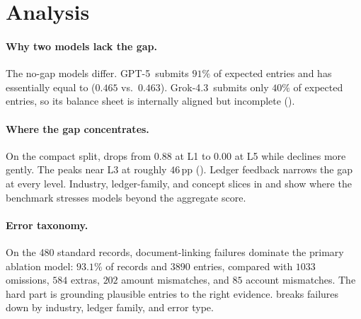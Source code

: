 \section{Analysis}
\label{sec:analysis}

\paragraph{Why two models lack the gap.}
The no-gap models differ. \mbox{GPT-5 submits} $91\%$ of expected entries and has \bsexact{} essentially equal to \bsrecon{} ($0.465$ vs.\ $0.463$). \mbox{Grok-4.3 submits} only $40\%$ of expected entries, so its balance sheet is internally aligned but incomplete ().

\paragraph{Where the gap concentrates.}
On the compact split, \bsexact{} drops from $0.88$ at L1 to $0.00$ at L5 while \bsrecon{} declines more gently. The \aggGap{} peaks near L3 at roughly $46$\,pp (). Ledger feedback narrows the gap at every level. Industry, ledger-family, and concept slices in  and  show where the benchmark stresses models beyond the aggregate score.

\paragraph{Error taxonomy.}
On the 480 standard records, document-linking failures dominate the primary ablation model: $93.1\%$ of records and $3890$ entries, compared with $1033$ omissions, $584$ extras, $202$ amount mismatches, and $85$ account mismatches. The hard part is grounding plausible entries to the right evidence.  breaks failures down by industry, ledger family, and error type.
